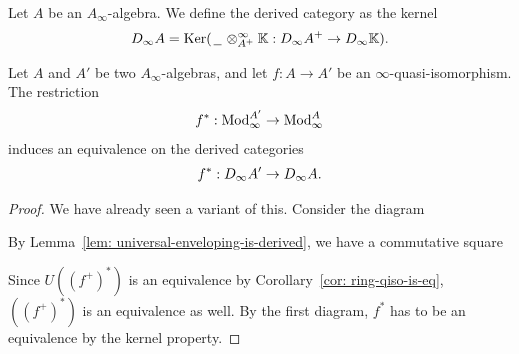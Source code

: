 \documentclass[../thesis.tex]{subfiles}
\begin{document}
            \begin{definition}
                Let $A$ be an $A_\infty$-algebra. We define the derived category as the kernel
                \begin{align*}
                    D_\infty A = \tt{Ker}(\argument\otimes_{A^+}^\infty\mathbb{K} : D_\infty A^+ \rightarrow D_\infty\mathbb{K})\tt{.}
                \end{align*}
            \end{definition}

            \begin{thm}\label{thm: derived-is-well-defined}
                Let $A$ and $A'$ be two $A_\infty$-algebras, and let $f : A \rightarrow A'$ be an $\infty$-quasi-isomorphism. The restriction
                \begin{align*}
                    f^* : \tt{Mod}_\infty^{A'} \rightarrow \tt{Mod}_\infty^{A}
                \end{align*}
                induces an equivalence on the derived categories
                \begin{align*}
                    f^* : D_\infty A' \rightarrow D_\infty A\tt{.}
                \end{align*}
            \end{thm}

            \begin{proof}
                We have already seen a variant of this. Consider the diagram
                \begin{center}
                \end{center}

                By Lemma~\ref{lem: universal-enveloping-is-derived}, we have a commutative square
                \begin{center}
                \end{center}

                Since $U((f^+)^*)$ is an equivalence by Corollary~\ref{cor: ring-qiso-is-eq}, $((f^+)^*)$ is an equivalence as well. By the first diagram, $f^*$ has to be an equivalence by the kernel property.
            \end{proof}
\end{document}
